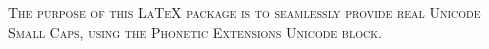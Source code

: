 \documentclass{article}
\begin{document}
\noindent\textsc{The purpose of this LaTeX package is to seamlessly provide 
real Unicode Small Caps, using the Phonetic Extensions Unicode block.}\newline
\par
\noindent{}
\end{document}

